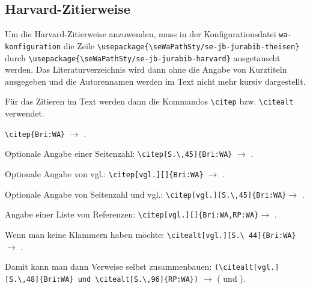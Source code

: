 \subsection{Harvard-Zitierweise}

Um die Harvard-Zitierweise anzuwenden, muss in der Konfigurationsdatei \newline
\hspace*{\fill}\verb+wa-konfiguration+\hspace*{\fill}\newline
die Zeile \newline
\hspace*{\fill}\verb+\usepackage{\seWaPathSty/se-jb-jurabib-theisen}+\hspace*{\fill}\newline
durch\newline
\hspace*{\fill}\verb+\usepackage{\seWaPathSty/se-jb-jurabib-harvard}+\hspace*{\fill}\newline
ausgetauscht werden. Das Literaturverzeichnis wird dann ohne die Angabe von 
Kurztiteln ausgegeben und die Autorennamen werden im Text nicht mehr kursiv 
dargestellt.

F\"ur das Zitieren im Text werden dann die Kommandos \verb+\citep+ bzw. \verb+\citealt+ 
verwendet.

\begin{seList}
\item \verb+\citep{Bri:WA}+ $\rightarrow$ \citep{Bri:WA}.
\item Optionale Angabe einer Seitenzahl: \verb+\citep[S.\,45]{Bri:WA}+ \newline$\rightarrow$ \citep[S.\,45]{Bri:WA}.
\item Optionale Angabe von vgl.: \verb+\citep[vgl.][]{Bri:WA}+ $\rightarrow$ \citep[vgl.][]{Bri:WA}.
\item Optionale Angabe von Seitenzahl und vgl.: \verb+\citep[vgl.][S.\,45]{Bri:WA}+\newline$\rightarrow$ \citep[vgl.][S.\,45]{Bri:WA}.
\item Angabe einer Liste von Referenzen: \verb+\citep[vgl.][]{Bri:WA,RP:WA}+\newline $\rightarrow$ \citep[vgl.][]{Bri:WA,RP:WA}.
\item Wenn man keine Klammern haben m\"ochte: \newline\verb+\citealt[vgl.][S.\ 44]{Bri:WA}+ $\rightarrow$ 
        \citealt[vgl.][S.\ 44]{Bri:WA}.
\item Damit kann man dann Verweise selbst zusammenbauen:
         \newline\verb+(\citealt[vgl.][S.\,48]{Bri:WA} und \citealt[S.\,96]{RP:WA})+      
         \newline$\rightarrow$ (\citealt[vgl.][S.\,48]{Bri:WA} und \citealt[S.\,96]{RP:WA}).
\end{seList}
